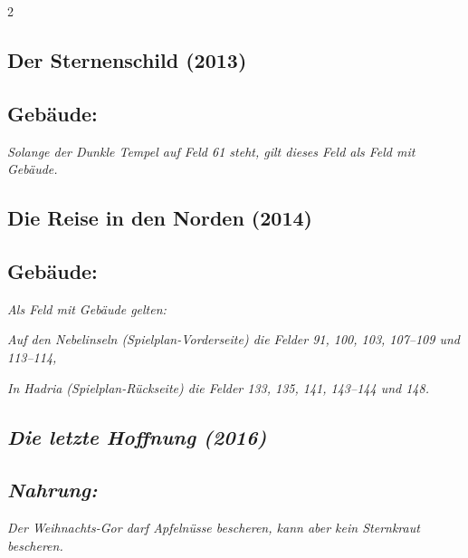 \documentclass[10pt, a4paper, oneside]{book}
\newcommand{\fan}[1]{\textit{#1}}
\begin{document}
\begin{multicols*}{2}
\begin{bgcolor}
\end{bgcolor}



\begin{bgcolor}
\section{Der Sternenschild (2013)}

\subsection{Gebäude:}

\fan{Solange der Dunkle Tempel auf Feld 61 steht, gilt dieses Feld als Feld mit Gebäude.}

\end{bgcolor}

\begin{bgcolor}
\section{Die Reise in den Norden (2014)}

\subsection{Gebäude:}

\fan{Als Feld mit Gebäude gelten:}

\bullet{} \fan{Auf den Nebelinseln (Spielplan-Vorderseite) die Felder 91, 100, 103, 107–109 und 113–114,}

\bullet{} \fan{In Hadria (Spielplan-Rückseite) die Felder 133, 135, 141, 143–144 und 148.}

\end{bgcolor}




\columnbreak


\begin{bgcolor}
\section{\fan{Die letzte Hoffnung (2016)}}

\subsection{\fan{Nahrung:}}

\fan{Der Weihnachts-Gor darf Apfelnüsse bescheren, kann aber kein Sternkraut bescheren.}






\end{bgcolor}
\end{multicols*}
\end{document}
